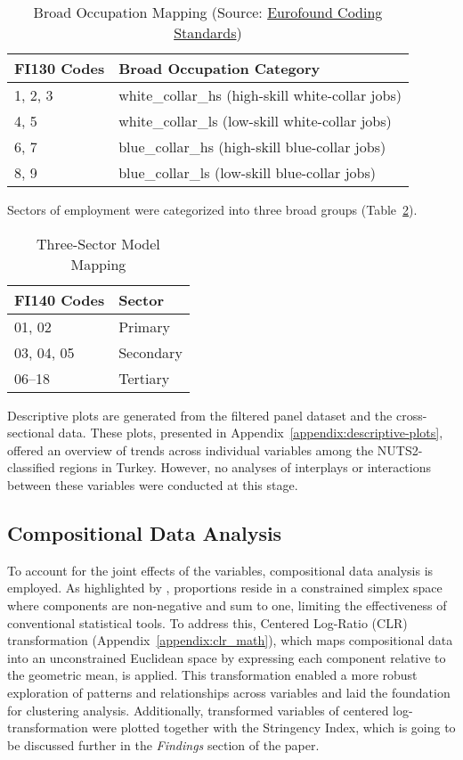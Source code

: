 \documentclass[a4paper,12pt]{article}
\begin{document}
\begin{table}[h!]
\centering
\begin{tabular}{|l|l|}
\hline
\textbf{FI130 Codes} & \textbf{Broad Occupation Category} \\ \hline
1, 2, 3 & white\_collar\_hs (high-skill white-collar jobs) \\ \hline
4, 5 & white\_collar\_ls (low-skill white-collar jobs) \\ \hline
6, 7 & blue\_collar\_hs (high-skill blue-collar jobs) \\ \hline
8, 9 & blue\_collar\_ls (low-skill blue-collar jobs) \\ \hline
\end{tabular}
\caption{Broad Occupation Mapping (Source: \href{https://www.eurofound.europa.eu/en/coding-and-classification-standards-0}{Eurofound Coding Standards})}
\label{tab:occupation-mapping}
\end{table}

Sectors of employment were categorized into three broad groups (Table~\ref{tab:sector-mapping}).

\begin{table}[H]
\centering
\begin{tabular}{|l|l|}
\hline
\textbf{FI140 Codes} & \textbf{Sector} \\ \hline
01, 02 & Primary \\ 
03, 04, 05 & Secondary \\ 
06–18 & Tertiary \\ \hline
\end{tabular}
\caption{Three-Sector Model Mapping}
\label{tab:sector-mapping}
\end{table}

Descriptive plots are generated from the filtered panel dataset and the cross-sectional data. These plots, presented in Appendix~\ref{appendix:descriptive-plots}, offered an overview of trends across individual variables among the NUTS2-classified regions in Turkey. However, no analyses of interplays or interactions between these variables were conducted at this stage.

\subsection{Compositional Data Analysis}

To account for the joint effects of the variables, compositional data analysis is employed. As highlighted by \cite{jackson2015}, proportions reside in a constrained simplex space where components are non-negative and sum to one, limiting the effectiveness of conventional statistical tools. To address this, Centered Log-Ratio (CLR) transformation (Appendix~\ref{appendix:clr_math}), which maps compositional data into an unconstrained Euclidean space by expressing each component relative to the geometric mean, is applied. This transformation enabled a more robust exploration of patterns and relationships across variables and laid the foundation for clustering analysis. Additionally, transformed variables of centered log-transformation were plotted together with the Stringency Index, which is going to be discussed further in the \textit{Findings} section of the paper.
\end{document}
